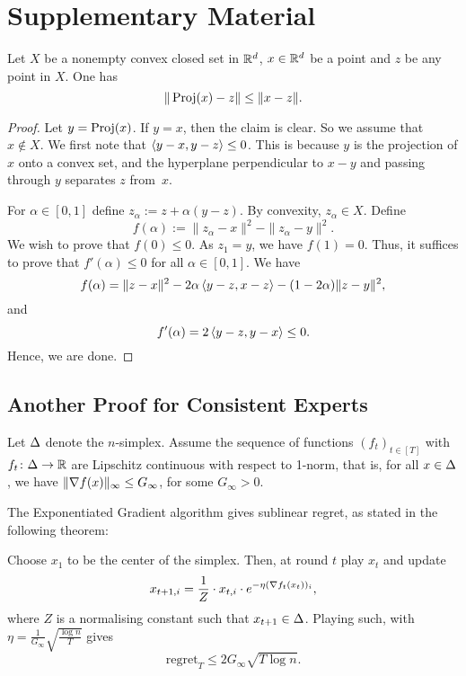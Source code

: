 \chapter{Supplementary Material}
\begin{lemma}\label{lem:projection}
    Let $X$ be a nonempty convex closed set in $\mathbb{R}^d$, $x\in \mathbb{R}^d$ be a point and $z$ be any point in $X$. One has
    \[
        \| \operatorname{Proj}(x) - z \| \leq \|x - z\|.
    \]
\end{lemma}
\begin{proof}
    Let $y = \operatorname{Proj}(x)$. If $y=x$, then the claim is clear. So we assume that $x\not\in X$. We first note that $\left\langle y-x,y-z \right\rangle \leq 0$. This is because $y$ is the projection of $x$ onto a convex set, and the hyperplane perpendicular to $x-y$ and passing through $y$ separates $z$ from~$x$.

    For $\alpha \in [0,1]$ define $z_\alpha := z + \alpha(y-z)$. By convexity, $z_\alpha \in X$. Define
    \[
        f(\alpha) := \|z_\alpha - x\|^2 - \|z_\alpha - y\|^2. 
    \]
    We wish to prove that $f(0) \leq 0$.  As $z_1 = y$, we have $f(1) = 0$. Thus, it suffices to prove that $f'(\alpha) \leq 0$ for all $\alpha\in[0,1]$. We have
    \[
        f(\alpha) = \|z-x\|^2 - 2\alpha\left\langle y-z,x-z \right\rangle - (1-2\alpha)\|z-y\|^2,
    \]
    and
    \[
        f'(\alpha) = 2\left\langle y-z,y-x \right\rangle \leq 0.
    \]
    Hence, we are done.
\end{proof}

\section{Another Proof for Consistent Experts}\label{app:experts}
Let $\Delta$ denote the $n$-simplex. Assume the sequence of functions $(f_t)_{t\in[T]}$ with $f_t\colon\Delta\to \mathbb{R}$ are Lipschitz continuous with respect to 1-norm, that is, for all $x\in\Delta$, we have $\|\nabla f(x)\|_\infty \leq G_\infty$, for some $G_\infty>0$.

The Exponentiated Gradient algorithm gives sublinear regret, as stated in the following theorem:
\begin{theorem}
    Choose $x_1$ to be the center of the simplex. Then, at round $t$ play $x_t$ and update
    \[
        x_{t+1, i} = \frac{1}{Z}\cdot x_{t,i} \cdot e^{-\eta (\nabla f_t(x_t))_i},
    \]
    where $Z$ is a normalising constant such that $x_{t+1}\in \Delta$. Playing such, with $\eta = \frac{1}{G_\infty} \sqrt{\frac{\log n}{T}}$ gives
    \[
        \mathrm{regret}_T \leq 2G_\infty \sqrt{T \log n}.
    \]
\end{theorem}

